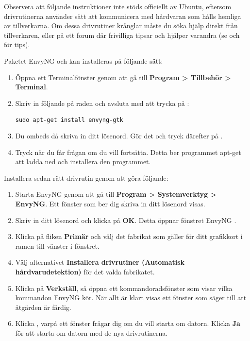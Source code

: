\documentclass[a4paper,final]{memoir} %
\begin{document}
Observera att följande instruktioner inte stöds officiellt av Ubuntu, eftersom drivrutinerna använder sätt att kommunicera med hårdvaran som hålls hemliga av tillverkarna. Om dessa drivrutiner krånglar måste du söka hjälp direkt från tillverkaren, eller på ett forum där frivilliga tipsar och hjälper varandra (se  och  för tips).

Paketet EnvyNG och kan installeras på följande sätt:

\begin{enumerate}

\item Öppna ett Terminalfönster genom att gå till \textbf{Program \textgreater{} Tillbehör \textgreater{} Terminal}.

\item Skriv in följande på raden och avsluta med att trycka på :

\texttt{sudo apt-get install envyng-gtk}

\item Du ombeds då skriva in ditt lösenord. Gör det och tryck därefter på . 

\item Tryck  när du får frågan om du vill fortsätta. Detta ber programmet apt-get att ladda ned och installera den programmet.

\end{enumerate}


Installera sedan rätt drivrutin genom att göra följande:

\begin{enumerate}

\item Starta EnvyNG genom att gå till \textbf{Program \textgreater{} Systemverktyg \textgreater{} EnvyNG}. Ett fönster som ber dig skriva in ditt lösenord visas.

\item Skriv in ditt lösenord och klicka på \textbf{OK}. Detta öppnar fönstret EnvyNG .

\item Klicka på fliken \textbf{Primär} och välj det fabrikat som gäller för ditt grafikkort i ramen till vänster i fönstret.

\item Välj alternativet \textbf{Installera drivrutiner (Automatisk hårdvarudetektion)} för det valda fabrikatet.

\item Klicka på \textbf{Verkställ}, så öppna ett kommandoradsfönster som visar vilka kommandon EnvyNG kör. När allt är klart visas ett fönster som säger till att åtgärden är färdig. 

\item Klicka \xok{}, varpå ett fönster frågar dig om du vill starta om datorn. Klicka \textbf{Ja} för att starta om datorn med de nya drivrutinerna.

\end{enumerate}
\end{document}
